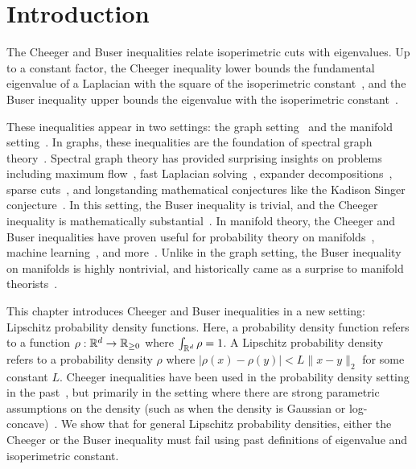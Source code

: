 \section{Introduction}

The Cheeger and Buser inequalities relate isoperimetric cuts with eigenvalues.
Up to a constant factor, the Cheeger inequality lower bounds the
fundamental eigenvalue of a Laplacian with the square of
the isoperimetric constant~\cite{Cheeger70, AlonM84}, and the Buser inequality upper
bounds the eigenvalue with the isoperimetric constant~\cite{Buser82, AlonM84}.

These inequalities appear in two settings: the graph
setting~\cite{AlonM84} and the manifold setting~\cite{Cheeger70,
Buser82}.  In graphs, these inequalities are the foundation of spectral
graph theory~\cite{ChungBook97, AlonM84}. Spectral graph theory
has provided surprising insights on problems including maximum
flow~\cite{CKMST}, fast Laplacian solving~\cite{KMP}, expander
decompositions~\cite{wulff17expander, sw19expander}, sparse
cuts~\cite{AlonM84, arv04, chawla05sparse}, and longstanding
mathematical conjectures like the Kadison Singer conjecture~\cite{MSS}.
In this setting, the Buser inequality is trivial, and the Cheeger
inequality is mathematically substantial~\cite{AlonM84,ChungBook97}.  In
manifold theory, the Cheeger and Buser inequalities have proven useful
for probability theory on manifolds~\cite{ledoux2004spectral}, machine
learning~\cite{belkin2004semisup}, and more~\cite{belkin2005towards, ledoux2004spectral}.
Unlike in the graph setting, the Buser inequality on manifolds is highly
nontrivial, and historically came as a surprise to manifold
theorists~\cite{Buser82, ledoux2004spectral}.

This chapter introduces Cheeger and Buser inequalities in a new setting:
Lipschitz probability density functions. 
Here, a
probability density function refers to a function $\rho: \mathbb{R}^d
\rightarrow \mathbb{R}_{\geq 0}$ where $\int_{\mathbb{R}^d} \rho = 1$. A Lipschitz
probability density refers to a probability density $\rho$ where
$|\rho(x)-\rho(y)| < L\|x-y\|_2$ for some constant $L$.
Cheeger inequalities
have been used in the probability density setting in the
past~\cite{Lee18survey}, but primarily in the setting where there are
strong parametric assumptions on the density (such as when the density
is Gaussian or log-concave)~\cite{Lee18survey}. 
We show that for general Lipschitz probability densities,  
either the Cheeger or the Buser inequality must fail using past
definitions of eigenvalue and isoperimetric constant.  

